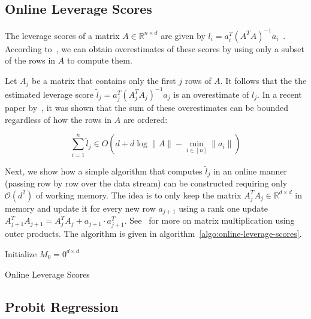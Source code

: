 \newpage

\subsection{Online Leverage Scores}

The leverage scores of a matrix $A \in \mathbb{R}^{n \times d}$
are given by $l_i = a_i^T (A^TA)^{-1}a_i$~\cite{online-row-sampling}.
According to~\cite{online-row-sampling}, we can obtain overestimates
of these scores by using only a subset of the rows in $A$ to compute them.

Let $A_j$ be a matrix that contains only the first $j$ rows of $A$.
It follows that the the estimated leverage score
$\tilde{l}_j = a_j^T (A_j^TA_j)^{-1}a_j$ is an overestimate of $l_j$.
In a recent paper by~\cite{tensor-factorization}, it was shown that
the sum of these overestimates can be bounded regardless of how
the rows in $A$ are ordered:
\begin{lemma}
    \begin{equation*}
        \sum_{i=1}^n \tilde{l}_j \in O(d + d \log \lVert A \rVert - \min_{i \in [n]} \lVert a_i \rVert)
    \end{equation*}
\end{lemma}

Next, we show how a simple algorithm that computes $\tilde{l}_j$ in an
online manner (passing row by row over the data stream)
can be constructed requiring only $\mathcal{O}(d^2)$ of working memory.
The idea is to only keep the matrix $A_j^TA_j \in \mathbb{R}^{d \times d}$
in memory and update it
for every new row $a_{j+1}$ using a rank one update
$A_{j+1}^TA_{j+1} = A_j^TA_j + a_{j+1} \cdot a_{j+1}^T$.
See~\cite{matrix-computations} for more on matrix multiplication using
outer products. The algorithm is given in algorithm~\ref{algo:online-leverage-scores}.

\begin{algorithm}
    \DontPrintSemicolon
    Initialize $M_0 = 0^{d \times d}$ \;
    \caption{Online Leverage Scores\label{algo:online-leverage-scores}}
\end{algorithm}

\subsection{Probit Regression}

